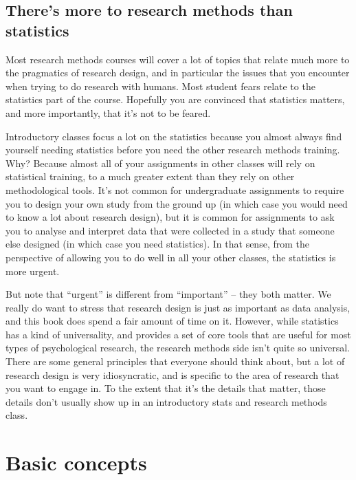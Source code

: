 \documentclass[
  11pt,
  a4paper,
  twoside,symmetric,openright]{book}
\theoremstyle{break}
\theoremstyle{break}
\begin{document}
\hypertarget{theres-more-to-research-methods-than-statistics}{%
\section{There's more to research methods than statistics}\label{theres-more-to-research-methods-than-statistics}}

Most research methods courses will cover a lot of topics that relate much more to the pragmatics of research design, and in particular the issues that you encounter when trying to do research with humans. Most student fears relate to the statistics part of the course. Hopefully you are convinced that statistics matters, and more importantly, that it's not to be feared.

Introductory classes focus a lot on the statistics because you almost always find yourself needing statistics before you need the other research methods training. Why? Because almost all of your assignments in other classes will rely on statistical training, to a much greater extent than they rely on other methodological tools. It's not common for undergraduate assignments to require you to design your own study from the ground up (in which case you would need to know a lot about research design), but it is common for assignments to ask you to analyse and interpret data that were collected in a study that someone else designed (in which case you need statistics). In that sense, from the perspective of allowing you to do well in all your other classes, the statistics is more urgent.

But note that ``urgent'' is different from ``important'' -- they both matter. We really do want to stress that research design is just as important as data analysis, and this book does spend a fair amount of time on it. However, while statistics has a kind of universality, and provides a set of core tools that are useful for most types of psychological research, the research methods side isn't quite so universal. There are some general principles that everyone should think about, but a lot of research design is very idiosyncratic, and is specific to the area of research that you want to engage in. To the extent that it's the details that matter, those details don't usually show up in an introductory stats and research methods class.

\hypertarget{researchdesign}{%
\chapter{Basic concepts}\label{researchdesign}}
\end{document}
